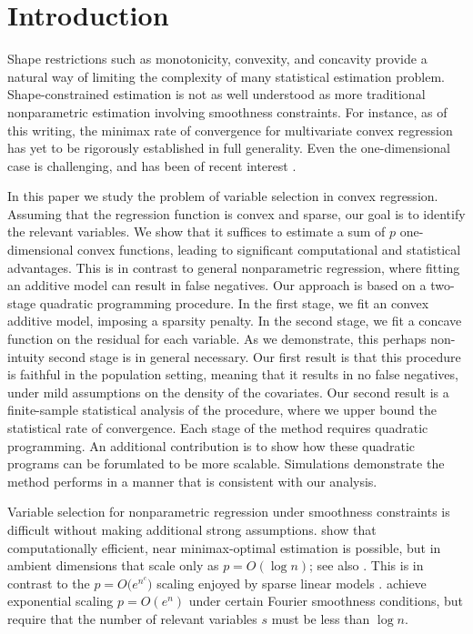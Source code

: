 \section{Introduction}


Shape restrictions such as monotonicity, convexity, and concavity
provide a natural way of limiting the complexity of many statistical
estimation problem.  Shape-constrained estimation is not as well
understood as more traditional nonparametric estimation involving
smoothness constraints.  For instance, as of this writing, the minimax
rate of convergence for multivariate convex regression has yet to be
rigorously established in full generality.  Even the one-dimensional
case is challenging, and has been of recent interest
\citep{guntusen:13}.

In this paper we study the problem of variable selection in convex
regression.  Assuming that the regression function is convex and
sparse, our goal is to identify the relevant variables.  We show that
it suffices to estimate a sum of $p$ one-dimensional convex functions,
leading to significant computational and statistical advantages.  This
is in contrast to general nonparametric regression, where fitting an
additive model can result in false negatives.  Our approach is based
on a two-stage quadratic programming procedure.  In the first stage,
we fit an convex additive model, imposing a sparsity penalty.  In the
second stage, we fit a concave function on the residual for each
variable.  As we demonstrate, this perhaps non-intuity second stage is
in general necessary.  Our first result is that this procedure is
faithful in the population setting, meaning that it results in no
false negatives, under mild assumptions on the density of the
covariates.  Our second result is a finite-sample statistical analysis
of the procedure, where we upper bound the statistical rate of
convergence.  Each stage of the method requires quadratic programming.
An additional contribution is to show how these quadratic programs can
be forumlated to be more scalable.  Simulations demonstrate the method
performs in a manner that is consistent with our analysis.

Variable selection for nonparametric
regression under smoothness constraints is difficult without
making additional strong assumptions. 
\cite{lafferty2008rodeo} show that computationally
efficient, near minimax-optimal estimation is possible, but in ambient
dimensions that scale only as $p = O(\log n)$; see also \cite{BertinLecue}.  This is in contrast
to the $p=O\bigl(e^{n^c}\bigr)$ scaling enjoyed by sparse linear
models \cite{Wain:09a}. \citet{dalalyan:12} achieve exponential scaling $p=O(e^n)$
under certain Fourier smoothness conditions, but require
that the number of relevant variables $s$ must be less than $\log n$.

